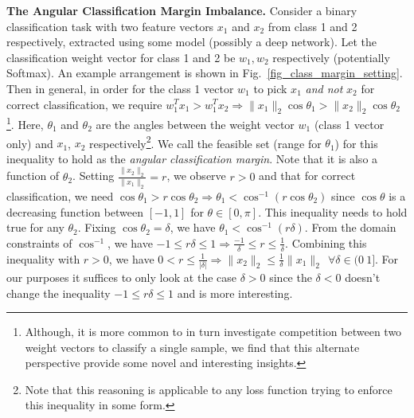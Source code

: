 \documentclass[10pt,twocolumn,letterpaper]{article}
\begin{document}
\textbf{The Angular Classification Margin Imbalance. } Consider a binary classification task with two feature vectors $x_1$ and $x_2$ from class 1 and 2 respectively, extracted using some model (possibly a deep network). Let the classification weight vector for class 1 and 2 be $w_1, w_2$ respectively (potentially Softmax). An example arrangement is shown in Fig.~\ref{fig_class_margin_setting}. Then in general, in order for the class 1 vector $w_1$ to pick $x_1$ \textit{and not} $x_2$ for correct classification, we require $w_1^T x_1 > w_1^Tx_2 \Rightarrow  \|x_1\|_2 \cos \theta_1  >  \|x_2\|_2\cos \theta_2$\footnote{Although, it is more common to in turn investigate competition between two weight vectors to classify a single sample, we find that this alternate perspective provide some novel and interesting insights.}. Here, $\theta_1$ and $\theta_2$ are the angles between the weight vector $w_1$ (class 1 vector only) and $x_1$, $x_2$ respectively\footnote{Note that this reasoning is applicable to any loss function trying to enforce this inequality in some form.}.  We call the feasible set (range for $\theta_1$) for this inequality to hold as the \textit{angular classification margin}. Note that it is also a function of $\theta_2$.  Setting $\frac{\|x_2\|_2}{\|x_1\|_2} = r$, we observe $r>0$ and that for correct classification, we need $\cos \theta_1 > r \cos \theta_2 \Rightarrow \theta_1 < \cos ^{-1}( r \cos \theta_2)$ since $\cos \theta$ is a decreasing function between $[-1, 1]$ for $\theta \in [0, \pi]$. This inequality needs to hold true for any $\theta_2$. Fixing $\cos \theta_2 = \delta$, we have $\theta_1 < \cos ^{-1} (r\delta)$. From the domain constraints of $\cos^{-1}$, we have $-1 \leq r\delta \leq 1 \Rightarrow \frac{-1}{\delta}  \leq r \leq \frac{1}{\delta }$. Combining this inequality with $r>0$, we have $ 0 < r \leq \frac{1}{|\delta|} \Rightarrow  \|x_2\|_2  \leq \frac{1}{\delta } \|x_1\|_2 ~~\forall  \delta \in (0 ~1]$. For our purposes it suffices to only look at the case $\delta > 0$ since the $\delta<0$ doesn't change the inequality $-1 \leq r\delta \leq 1 $ and is more interesting. 


\end{document}
